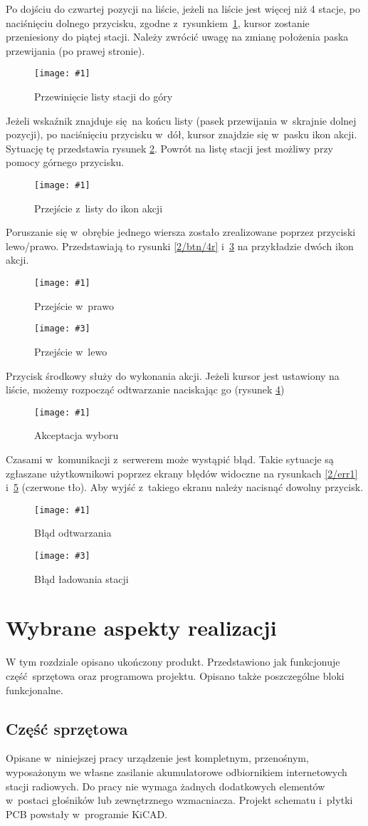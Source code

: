 \documentclass[polish]{aghengthesis}
\newcommand{\imgint}[4]{
	\begin{figure}[{#4}]
		\centering
		\texttt{[image: \#1]}
		\caption{#2}
		\label{#1}
	\end{figure}
}
\newcommand{\imgh}[3]{\imgint{#1}{#2}{#3}{H}}
\newcommand{\imgintss}[5]{
	\begin{figure}[{#5}]
		\centering
		\begin{minipage}{.45\textwidth}
			\centering
			\texttt{[image: \#1]}
			\caption{#2}
			\label{#1}
		\end{minipage}%
		\hfill
		\begin{minipage}{.45\textwidth}
			\centering
			\texttt{[image: \#3]}
			\caption{#4}
			\label{#3}
		\end{minipage}
	\end{figure}
}
\newcommand{\imghss}[4]{\imgintss{#1}{#2}{#3}{#4}{H}}
\begin{document}
		Po dojściu do czwartej pozycji na liście, jeżeli na liście jest więcej niż 4 stacje, po naciśnięciu dolnego przycisku, zgodne z~rysunkiem~\ref{2/btn/2}, kursor zostanie przeniesiony do piątej stacji. Należy zwrócić uwagę na zmianę położenia paska przewijania (po prawej stronie).
		\imgh{2/btn/2}{Przewinięcie listy stacji do góry}{0.7}
		
		Jeżeli wskaźnik znajduje się na końcu listy (pasek przewijania w~skrajnie dolnej pozycji), po naciśnięciu przycisku w~dół, kursor znajdzie się w~pasku ikon akcji. Sytuację tę przedstawia rysunek \ref{2/btn/3}. Powrót na listę stacji jest możliwy przy pomocy górnego przycisku.
		\imgh{2/btn/3}{Przejście z~listy do ikon akcji}{0.7}
		
		Poruszanie się w~obrębie jednego wiersza zostało zrealizowane poprzez przyciski \mbox{lewo/prawo}. Przedstawiają to rysunki \ref{2/btn/4r} i~\ref{2/btn/4l} na przykładzie dwóch ikon akcji.
		\imghss{2/btn/4r}{Przejście w~prawo}{2/btn/4l}{Przejście w~lewo}
		
		Przycisk środkowy służy do wykonania akcji. Jeżeli kursor jest ustawiony na liście, możemy rozpocząć odtwarzanie naciskając go (rysunek \ref{2/btn/5})
		\imgh{2/btn/5}{Akceptacja wyboru}{0.7}
				
		Czasami w~komunikacji z~serwerem może wystąpić błąd. Takie sytuacje są zgłaszane użytkownikowi poprzez ekrany błędów widoczne na rysunkach \ref{2/err1} i~\ref{2/err2} (czerwone tło). Aby wyjść z~takiego ekranu należy nacisnąć dowolny przycisk.
		\imghss{2/err1}{Błąd odtwarzania}{2/err2}{Błąd ładowania stacji}

\chapter{Wybrane aspekty realizacji}
	W tym rozdziale opisano ukończony produkt.
	Przedstawiono jak funkcjonuje część sprzętowa oraz programowa projektu. Opisano także poszczególne bloki funkcjonalne.
	
	\section{Część sprzętowa}
		\label{sec:hw}
		Opisane w~niniejszej pracy urządzenie jest kompletnym, przenośnym, wyposażonym we własne zasilanie akumulatorowe  odbiornikiem internetowych stacji radiowych. Do pracy nie wymaga żadnych dodatkowych elementów w~postaci głośników lub zewnętrznego wzmacniacza.
		Projekt schematu i~płytki PCB powstały w~programie KiCAD\textsuperscript{\cite{hw_kicad}}.
	
\end{document}
